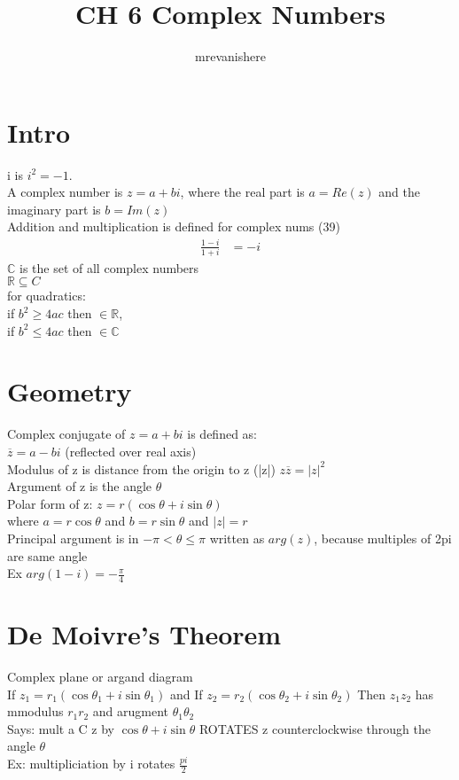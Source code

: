 \documentclass[12pt]{article}
\newcommand{\R}{\mathbb{R}}
\newcommand{\C}{\mathbb{C}}
\begin{document}
\title{CH 6 Complex Numbers}
\author{mrevanishere}
\maketitle


\section{Intro}
	i is $ i^2 = -1 $.\\
	A complex number is $ z = a+bi $,
	where the real part is $ a= Re(z) $ and the imaginary part is
	$ b= Im(z) $\\
	Addition and multiplication is defined for complex nums (39)
	\begin{align*}
		\frac{1-i}{1+i} &= -i 
	\end{align*}
	$ \C $ is the set of all complex numbers \\
	$ \R \subseteq C $ \\
	for quadratics:\\
	if $ b^2 \ge 4ac $ then $ \in\R $,\\
	if $ b^2 \le 4ac $ then $ \in\C $
\section{Geometry}
	Complex conjugate of $ z= a+bi $ is defined as:\\
	$ \overline{z} = a-bi $ (reflected over real axis) \\
	Modulus of z is distance from the origin to z (|z|)
	$ z \overline{z} = |z|^2 $ \\
	Argument of z is the angle $ \theta $ \\
	Polar form of z: $ z= r(\cos\theta +i\sin\theta) $ \\
	where $ a= r\cos\theta $ and $ b= r\sin\theta $ and $ |z| = r $\\
	Principal argument is in $ -\pi < \theta \le \pi $ written as 
	$ arg(z) $, because multiples of 2pi are same angle\\
	Ex $ arg(1-i) = -\frac{\pi}{4} $
\section{De Moivre's Theorem}
	Complex plane or argand diagram\\
	If $ z_1 = r_1(\cos\theta_1 + i\sin\theta_1) $ and
	If $ z_2 = r_2(\cos\theta_2 + i\sin\theta_2) $
	Then $ z_1z_2 $ has mmodulus $ r_1r_2 $ and arugment $ \theta_1\theta_2 $\\
    Says: mult a C z by $ \cos\theta + i\sin\theta $ ROTATES z 
	counterclockwise through the angle $ \theta $ \\
	Ex: multipliciation by i rotates $ \frac{pi}{2} $
\end{document}
